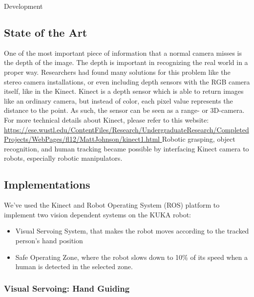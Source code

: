 \documentclass[a4paper]{book}
\begin{document}
\begin{chapter}{Development}
\subsection{State of the Art}

One of the most important piece of information that a normal camera misses is the depth of the image. The depth is important in recognizing the real world in a proper way. Researchers had found many solutions for this problem like the stereo camera installations, or even including depth sensors with the RGB camera itself, like in the Kinect.
Kinect is a depth sensor which is able to return images like an ordinary camera, but instead of color, each pixel value represents the distance to the point. As such, the sensor can be seen as a range- or 3D-camera. For more technical details about Kinect, please refer to this website:
\newline \url{ https://ese.wustl.edu/ContentFiles/Research/UndergraduateResearch/CompletedProjects/WebPages/fl12/MattJohnson/kinect1.html }
Robotic grasping, object recognition, and human tracking became possible by interfacing Kinect camera to robots, especially robotic manipulators.

\subsection{Implementations}
We’ve used the Kinect and Robot Operating System (ROS) platform to implement two vision dependent systems on the KUKA robot:\begin{itemize}
	\item Visual Servoing System, that makes the robot moves according to the tracked person’s hand position
	\item Safe Operating Zone, where the robot slows down to 10\% of its speed when a human is detected in the selected zone.
\end{itemize}



\subsubsection{Visual Servoing: Hand Guiding}

\end{chapter}
\end{document}
